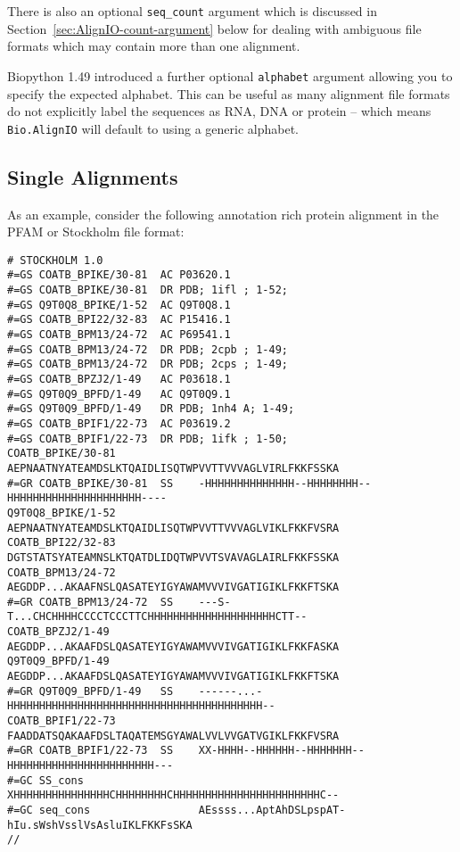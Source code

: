 \documentclass{report}
\begin{document}
\noindent There is also an optional \verb|seq_count| argument which is discussed in Section~\ref{sec:AlignIO-count-argument} below for dealing with ambiguous file formats which may contain more than one alignment.

Biopython 1.49 introduced a further optional \verb|alphabet| argument allowing you to specify the expected alphabet. This can be useful as many alignment file formats do not explicitly label the sequences as RNA, DNA or protein -- which means \verb|Bio.AlignIO| will default to using a generic alphabet.

\subsection{Single Alignments}
As an example, consider the following annotation rich protein alignment in the PFAM or Stockholm file format:

\begin{verbatim}
# STOCKHOLM 1.0
#=GS COATB_BPIKE/30-81  AC P03620.1
#=GS COATB_BPIKE/30-81  DR PDB; 1ifl ; 1-52;
#=GS Q9T0Q8_BPIKE/1-52  AC Q9T0Q8.1
#=GS COATB_BPI22/32-83  AC P15416.1
#=GS COATB_BPM13/24-72  AC P69541.1
#=GS COATB_BPM13/24-72  DR PDB; 2cpb ; 1-49;
#=GS COATB_BPM13/24-72  DR PDB; 2cps ; 1-49;
#=GS COATB_BPZJ2/1-49   AC P03618.1
#=GS Q9T0Q9_BPFD/1-49   AC Q9T0Q9.1
#=GS Q9T0Q9_BPFD/1-49   DR PDB; 1nh4 A; 1-49;
#=GS COATB_BPIF1/22-73  AC P03619.2
#=GS COATB_BPIF1/22-73  DR PDB; 1ifk ; 1-50;
COATB_BPIKE/30-81             AEPNAATNYATEAMDSLKTQAIDLISQTWPVVTTVVVAGLVIRLFKKFSSKA
#=GR COATB_BPIKE/30-81  SS    -HHHHHHHHHHHHHH--HHHHHHHH--HHHHHHHHHHHHHHHHHHHHH----
Q9T0Q8_BPIKE/1-52             AEPNAATNYATEAMDSLKTQAIDLISQTWPVVTTVVVAGLVIKLFKKFVSRA
COATB_BPI22/32-83             DGTSTATSYATEAMNSLKTQATDLIDQTWPVVTSVAVAGLAIRLFKKFSSKA
COATB_BPM13/24-72             AEGDDP...AKAAFNSLQASATEYIGYAWAMVVVIVGATIGIKLFKKFTSKA
#=GR COATB_BPM13/24-72  SS    ---S-T...CHCHHHHCCCCTCCCTTCHHHHHHHHHHHHHHHHHHHHCTT--
COATB_BPZJ2/1-49              AEGDDP...AKAAFDSLQASATEYIGYAWAMVVVIVGATIGIKLFKKFASKA
Q9T0Q9_BPFD/1-49              AEGDDP...AKAAFDSLQASATEYIGYAWAMVVVIVGATIGIKLFKKFTSKA
#=GR Q9T0Q9_BPFD/1-49   SS    ------...-HHHHHHHHHHHHHHHHHHHHHHHHHHHHHHHHHHHHHHHH--
COATB_BPIF1/22-73             FAADDATSQAKAAFDSLTAQATEMSGYAWALVVLVVGATVGIKLFKKFVSRA
#=GR COATB_BPIF1/22-73  SS    XX-HHHH--HHHHHH--HHHHHHH--HHHHHHHHHHHHHHHHHHHHHHH---
#=GC SS_cons                  XHHHHHHHHHHHHHHHCHHHHHHHHCHHHHHHHHHHHHHHHHHHHHHHHC--
#=GC seq_cons                 AEssss...AptAhDSLpspAT-hIu.sWshVsslVsAsluIKLFKKFsSKA
//
\end{verbatim}
\end{document}
